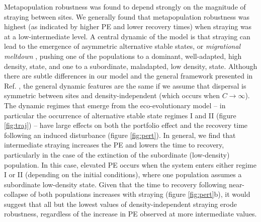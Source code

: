 \documentclass{revtex4}
\begin{document}
Metapopulation robustness was found to depend strongly on the magnitude of straying between sites.
We generally found that metapopulation robustness was highest (as indicated by higher PE and lower recovery times) when straying was at a low-intermediate level. 
A central dynamic of the model is that straying can lead to the emergence of asymmetric alternative stable states, or \emph{migrational meltdown} \citep{Ronce:2001dp}, pushing one of the populations to a dominant, well-adapted, high density, state, and one to a subordinate, maladapted, low density, state.
Although there are subtle differences in our model and the general framework presented in Ref. \citep{Ronce:2001dp}, the general dynamic features are the same if we assume that dispersal is symmetric between sites and density-independent (which occurs when $C\rightarrow\infty$).
The dynamic regimes that emerge from the eco-evolutionary model -- in particular the occurrence of alternative stable state regimes I and II (figure \ref{fig:traj}) -- have large effects on both the portfolio effect and the recovery time following an induced disturbance (figure \ref{fig:pert}).
In general, we find that intermediate straying increases the PE and lowers the time to recovery, particularly in the case of the extinction of the subordinate (low-density) population.
In this case, elevated PE occurs when the system enters either regime I or II (depending on the initial conditions), where one population assumes a subordinate low-density state. 
Given that the time to recovery following near-collapse of both populations increases with straying (figure \ref{fig:pert}b), it would suggest that all but the lowest values of density-independent straying erode robustness, regardless of the increase in PE observed at more intermediate values.

\end{document}
